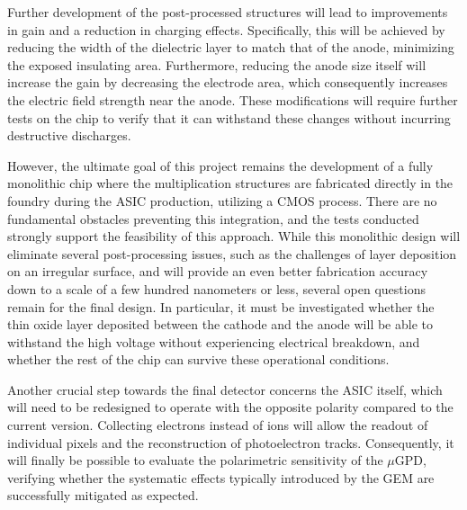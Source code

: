 Further development of the post-processed structures will lead to improvements in gain and a reduction in charging effects. Specifically, this will be achieved by reducing the width of the dielectric layer to match that of the anode, minimizing the exposed insulating area. Furthermore, reducing the anode size itself will increase the gain by decreasing the electrode area, which consequently increases the electric field strength near the anode. These modifications will require further tests on the chip to verify that it can withstand these changes without incurring destructive discharges.

However, the ultimate goal of this project remains the development of a fully monolithic chip where the multiplication structures are fabricated directly in the foundry during the ASIC production, utilizing a CMOS process. There are no fundamental obstacles preventing this integration, and the tests conducted strongly support the feasibility of this approach. While this monolithic design will eliminate several post-processing issues, such as the challenges of layer deposition on an irregular surface, and will provide an even better fabrication accuracy down to a scale of a few hundred nanometers or less, several open questions remain for the final design. In particular, it must be investigated whether the thin oxide layer deposited between the cathode and the anode will be able to withstand the high voltage without experiencing electrical breakdown, and whether the rest of the chip can survive these operational conditions.

Another crucial step towards the final detector concerns the ASIC itself, which will need to be redesigned to operate with the opposite polarity compared to the current version. Collecting electrons instead of ions will allow the readout of individual pixels and the reconstruction of photoelectron tracks. Consequently, it will finally be possible to evaluate the polarimetric sensitivity of the $\mu$GPD, verifying whether the systematic effects typically introduced by the GEM are successfully mitigated as expected.


